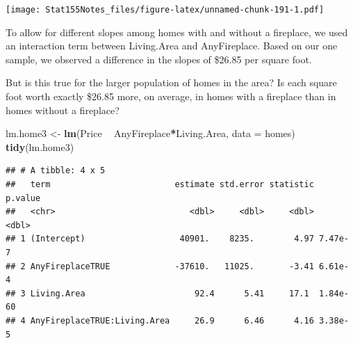 \documentclass[]{book}
\newenvironment{Shaded}{\begin{snugshade}}{\end{snugshade}}
\newcommand{\DataTypeTok}[1]{\textcolor[rgb]{0.13,0.29,0.53}{#1}}
\newcommand{\DecValTok}[1]{\textcolor[rgb]{0.00,0.00,0.81}{#1}}
\newcommand{\FloatTok}[1]{\textcolor[rgb]{0.00,0.00,0.81}{#1}}
\newcommand{\KeywordTok}[1]{\textcolor[rgb]{0.13,0.29,0.53}{\textbf{#1}}}
\newcommand{\NormalTok}[1]{#1}
\newcommand{\OperatorTok}[1]{\textcolor[rgb]{0.81,0.36,0.00}{\textbf{#1}}}
\newcommand{\StringTok}[1]{\textcolor[rgb]{0.31,0.60,0.02}{#1}}
\begin{document}
\begin{Shaded}
\end{Shaded}

\texttt{[image: Stat155Notes\_files/figure-latex/unnamed-chunk-191-1.pdf]}

To allow for different slopes among homes with and without a fireplace, we used an interaction term between Living.Area and AnyFireplace. Based on our one sample, we observed a difference in the slopes of \$26.85 per square foot.

But is this true for the larger population of homes in the area? Is each square foot worth exactly \$26.85 more, on average, in homes with a fireplace than in homes without a fireplace?

\begin{Shaded}
\begin{Highlighting}[]
\NormalTok{lm.home3 <-}\StringTok{ }\KeywordTok{lm}\NormalTok{(Price }\OperatorTok{~}\StringTok{ }\NormalTok{AnyFireplace}\OperatorTok{*}\NormalTok{Living.Area, }\DataTypeTok{data =}\NormalTok{ homes)}
\KeywordTok{tidy}\NormalTok{(lm.home3)}
\end{Highlighting}
\end{Shaded}

\begin{verbatim}
## # A tibble: 4 x 5
##   term                         estimate std.error statistic  p.value
##   <chr>                           <dbl>     <dbl>     <dbl>    <dbl>
## 1 (Intercept)                   40901.    8235.        4.97 7.47e- 7
## 2 AnyFireplaceTRUE             -37610.   11025.       -3.41 6.61e- 4
## 3 Living.Area                      92.4      5.41     17.1  1.84e-60
## 4 AnyFireplaceTRUE:Living.Area     26.9      6.46      4.16 3.38e- 5
\end{verbatim}
\end{document}
